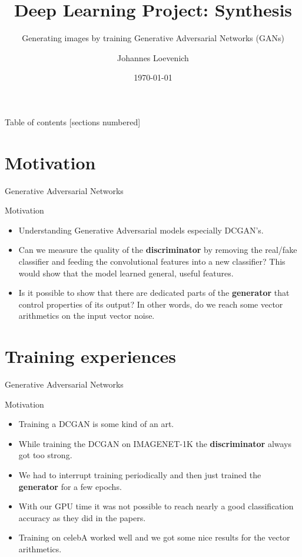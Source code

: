\documentclass[10pt]{beamer}
\title{Deep Learning Project: Synthesis}
\subtitle{Generating images by training Generative Adversarial Networks (GANs)}
\date{\today}
\author{Johannes Loevenich}
\institute{University of Bonn}
\begin{document}
\maketitle

\begin{frame}{Table of contents}
  [sections numbered]
  \tableofcontents[hideallsubsections]
\end{frame}

\section{Motivation}

{
\begin{frame}{Generative Adversarial Networks}
      \begin{block}{Motivation}
	\begin{itemize}[<+- | alert@+>]
    \item Understanding Generative Adversarial models especially DCGAN's.
    \item Can we measure the quality of the \textbf{discriminator} by removing the real/fake classifier and feeding the convolutional features into a new classifier? This would show that the model learned general, useful features.
    \item Is it possible to show that there are dedicated parts of the \textbf{generator} that control properties of its output? In other words, do we reach some vector arithmetics on the input vector noise.
  \end{itemize}
    \end{block}
\end{frame}
}

\section{Training experiences}

{
\begin{frame}{Generative Adversarial Networks}
      \begin{block}{Motivation}
	\begin{itemize}[<+- | alert@+>]
    \item Training a DCGAN is some kind of an art.
    \item While training the DCGAN on IMAGENET-1K the \textbf{discriminator} always got too strong. 
    \item We had to interrupt training periodically and then just trained the \textbf{generator} for a few epochs. 
    \item With our GPU time it was not possible to reach nearly a good classification accuracy as they did in the papers.
    \item Training on celebA worked well and we got some nice results for the vector arithmetics. 
  \end{itemize}
    \end{block}
\end{frame}
}
\end{document}
